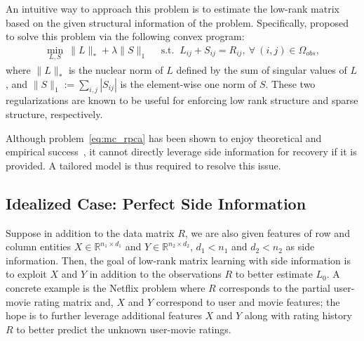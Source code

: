 \documentclass[twoside,11pt]{article}
\def\R{\mathbb{R}}
\def\Obs{\Omega_{obs}}
\def\realL{L_0}
\begin{document}
An intuitive way to approach this problem is to estimate the low-rank matrix
based on the given structural information of the problem.  Specifically, \citet{Candes11a}
proposed to solve this problem via the following convex program:
\begin{align}
  \min_{L, S}  \ \|L\|_* + \lambda \|S\|_1 \quad
  \text{ s.t. } \  L_{ij}+S_{ij}=R_{ij}, \ \forall \ (i,j)\in \Obs,
  \label{eq:mc_rpca}
\end{align}
where $\|L\|_*$ is the nuclear norm of $L$ defined by the sum of singular values of $L$,
and $\|S\|_1 := \sum_{i,j} |S_{ij}|$ is the element-wise one norm of $S$.
These two regularizations are known to be useful for enforcing low rank structure
and sparse structure, respectively.  %

Although problem~\eqref{eq:mc_rpca} has been shown to enjoy
theoretical and empirical success~\citep{Candes11a}, it cannot directly leverage side information
for recovery if it is provided.
A tailored model is thus required to resolve this issue.

\subsection{Idealized Case: Perfect Side Information}
\label{subsec:perfect}
Suppose in addition to the data matrix $R$,
we are also given features of row and column entities $X \in \R^{n_1\times d_1}$ and $Y\in \R^{n_2\times d_2}$,
$d_1 < n_1$ and $d_2 < n_2$ as side information.
Then, the goal of low-rank matrix learning with side information
is to exploit $X$ and $Y$ in addition to the observations $R$ to better estimate $\realL$.
A concrete example is the Netflix problem where $R$ corresponds to the partial user-movie
rating matrix and, $X$ and $Y$ correspond to user and movie features;
the hope is to further leverage additional features $X$ and $Y$ along with
rating history $R$ to better predict the unknown user-movie ratings.
\end{document}
